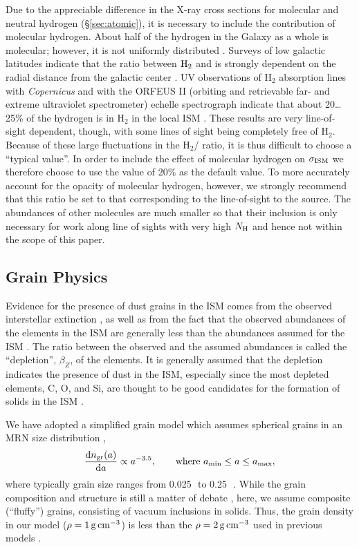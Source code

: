 \documentclass{aastex}
\newcommand{\sigism}{\ensuremath{\sigma_{\rm ISM}}}
\newcommand{\dd}{\ensuremath{{\rm d}}}
\begin{document}
Due to the appreciable difference in the X-ray cross sections for
molecular and neutral hydrogen (\S\ref{sec:atomic}), it is
necessary  to include the contribution of molecular
hydrogen.  About half of the hydrogen in the Galaxy as a whole is
molecular; however, it is not uniformly distributed
\citep{shull:82b}.  Surveys of low galactic latitudes indicate
that the ratio between ${\rm H}_2$ and  is strongly
dependent on the radial distance from the galactic center
\citep{brinks:90a,bronfman:88a}.  UV observations of H$_2$
absorption lines with \textsl{Copernicus} and with the ORFEUS II
(orbiting and retrievable far- and extreme ultraviolet
spectrometer) echelle spectrograph indicate that about 20\ldots
25\% of the hydrogen is in H$_2$ in the local ISM
\citep{savage:77a,gringel:00a}. These results are very
line-of-sight dependent, though, with some lines of sight being 
completely free of H$_2$. Because of these large fluctuations in
the H$_2$/ ratio, it is thus difficult to choose a
``typical value''. In order to include the effect of molecular
hydrogen on $\sigism$ we therefore choose to use the value
of 20\% as the default value.  To more accurately account for the
opacity of molecular hydrogen, however, we strongly recommend
that this ratio be set to that corresponding to the line-of-sight
to the source. The abundances of other molecules are much smaller
so that their inclusion is only necessary for work along line of
sights with very high $N_{\rm H}$ and hence not within the scope
of this paper.


\subsection{Grain Physics}\label{sec:grain}
Evidence for the presence of dust grains in the ISM comes from the
observed interstellar extinction \citep{fitzpatrick:99a,mathis:90a},
as well as from the fact that the observed abundances of the elements
in the ISM are generally less than the abundances assumed for the ISM
\citep{savage:96b}.  The ratio between the observed and the assumed
abundances is called the ``depletion'', $\beta_Z$, of the elements. It
is generally assumed that the depletion indicates the presence of dust
in the ISM, especially since the most depleted elements, C, O, and Si,
are thought to be good candidates for the formation of solids in the
ISM \citep[and references therein]{sofia:94a,snow:95a,mathis:96b}.

We have adopted a simplified grain model which assumes spherical
grains in an MRN size distribution \citep{mathis:77a},
\begin{equation}\label{eq:mrn}
\frac{\dd n_{\rm gr}(a)}{\dd a}\propto a^{-3.5},
\qquad \text{where $a_{\rm min}\leq a \leq a_{\rm max}$},
\end{equation}
where typically grain size ranges from 0.025\,\micron\ to
0.25\,\micron\ \citep{draine:84a}.  While the grain composition and
structure is still a matter of debate
\citep{mathis:96b,dwek:97a,smith:98a,wolff:98a}, here, we assume
composite (``fluffy'') grains, consisting of vacuum inclusions in
solids.  Thus, the grain density in our model ($\rho=1\,\rm
g\,cm^{-3}$) is less than the $\rho=2\,\rm g\,cm^{-3}$ used in
previous models \citep[][, MM83]{fireman:74a,ride:77a}.
\end{document}
